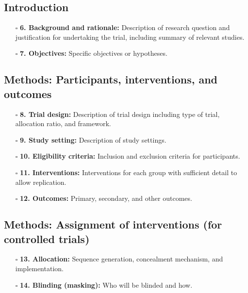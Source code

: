 \documentclass[11pt]{article}
\def\tightlist{}
\begin{document}
\begin{Form}
\subsection{Introduction}\label{introduction}

\begin{itemize}
\tightlist
\item[$\square$]
  \textbf{6. Background and rationale:} Description of research question
  and justification for undertaking the trial, including summary of
  relevant studies.
\item[$\square$]
  \textbf{7. Objectives:} Specific objectives or hypotheses.
\end{itemize}

\subsection{Methods: Participants, interventions, and
outcomes}\label{methods-participants-interventions-and-outcomes}

\begin{itemize}
\tightlist
\item[$\square$]
  \textbf{8. Trial design:} Description of trial design including type
  of trial, allocation ratio, and framework.
\item[$\square$]
  \textbf{9. Study setting:} Description of study settings.
\item[$\square$]
  \textbf{10. Eligibility criteria:} Inclusion and exclusion criteria
  for participants.
\item[$\square$]
  \textbf{11. Interventions:} Interventions for each group with
  sufficient detail to allow replication.
\item[$\square$]
  \textbf{12. Outcomes:} Primary, secondary, and other outcomes.
\end{itemize}

\subsection{Methods: Assignment of interventions (for controlled
trials)}\label{methods-assignment-of-interventions-for-controlled-trials}

\begin{itemize}
\tightlist
\item[$\square$]
  \textbf{13. Allocation:} Sequence generation, concealment mechanism,
  and implementation.
\item[$\square$]
  \textbf{14. Blinding (masking):} Who will be blinded and how.
\end{itemize}


\end{Form}
\end{document}
